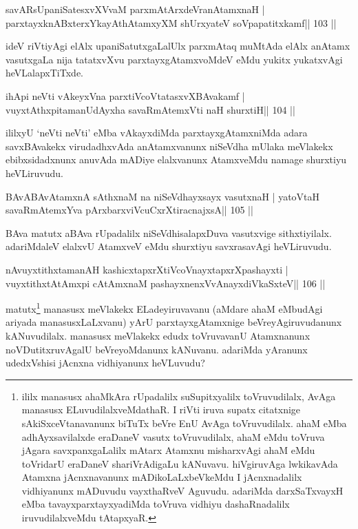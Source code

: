 \begin{shl}
savARsUpaniSatesxvXVvaM parxmAtArxdeVranAtamxnaH |
parxtayxknABxterxYkayAthAtamxyXM shUrxyateV soVpapatitxkamf\hfill || 103 ||
\end{shl}

\begin{artha}
ideV riVtiyAgi elAlx upaniSatutxgaLalUlx parxmAtaq muMtAda elAlx anAtamx
vasutxgaLa nija tatatxvXvu parxtayxgAtamxvoMdeV eMdu yukitx yukatxvAgi heVLalapxTiTxde.
\end{artha}

\begin{shl}
ihApi neVti vAkeyxVna parxtiVcoV\s tatasxvXBAvakamf |
vuyxtAthxpitamanUdAyx\s\s ha savaRmAtemxVti naH shurxtiH\hfill || 104 ||
\end{shl}

\begin{artha}
ililxyU `neVti neVti' eMba vAkayxdiMda parxtayxgAtamxniMda adara savxBAvakekx virudadhxvAda anAtamxvanunx niSeVdha mUlaka meVlakekx ebibxsidadxnunx anuvAda mADiye elalxvanunx AtamxveMdu namage shurxtiyu heVLiruvudu.
\end{artha}


\begin{shl}
BAvABAvAtamxnA sAthxnaM na niSeVdhayxsayx vasutxnaH |
yatoV\s taH savaRmAtemxYva pArxbarxviVcuCxrXtiracnajxsA\hfill || 105 ||
\end{shl}

\begin{artha}
BAva matutx aBAva rUpadalilx niSeVdhisalapxDuva vasutxvige sithxtiyilalx. adariMdaleV elalxvU AtamxveV eMdu shurxtiyu savxrasavAgi heVLiruvudu.
\end{artha}

\begin{shl}
nAvuyxtithxtamanAH kashicxtapxrXtiVcoV\s nayxtapxrXpashayxti |
vuyxtithxtAtAmx\s pi cA\s\s tAmxnaM pashayxnenxVvAnayxdiVkaSxteV\hfill || 106 ||
\end{shl}

\begin{artha}
matutx\footnote[1]{ililx manasusx ahaMkAra rUpadalilx suSupitxyalilx
  toVruvudilalx, AvAga manasusx ELuvudilalxveMdathaR. I riVti iruva
  supatx citatxnige sAkiSxceVtanavanunx biTuTx beVre EnU
  AvAga toVruvudilalx. ahaM eMba adhAyxsavilalxde eraDaneV vasutx
  toVruvudilalx, ahaM eMdu toVruva jAgara savxpanxgaLalilx mAtarx
  Atamxnu misharxvAgi ahaM eMdu toVridarU eraDaneV shariVrAdigaLu
  kANuvavu. hiVgiruvAga lwkikavAda Atamxna jAcnxnavanunx
  mADikoLaLxbeVkeMdu I jAcnxnadalilx vidhiyanunx mADuvudu vayxthaRveV
  Aguvudu. adariMda darxSaTxvayxH eMba tavayxparxtayxyadiMda toVruva
  vidhiyu dashaRnadalilx iruvudilalxveMdu tAtapxyaR.} manasusx 
  meVlakekx ELadeyiruvavanu (aMdare ahaM eMbudAgi ariyada 
  manasusxLaLxvanu) yArU parxtayxgAtamxnige 
beVreyAgiruvudanunx kANuvudilalx. manasusx meVlakekx edudx toVruvavanU
Atamxnanunx noVDutitxruvAgalU beVreyoMdanunx kANuvanu. adariMda
yAranunx udedxVshisi jAcnxna vidhiyanunx heVLuvudu?
\end{artha}

